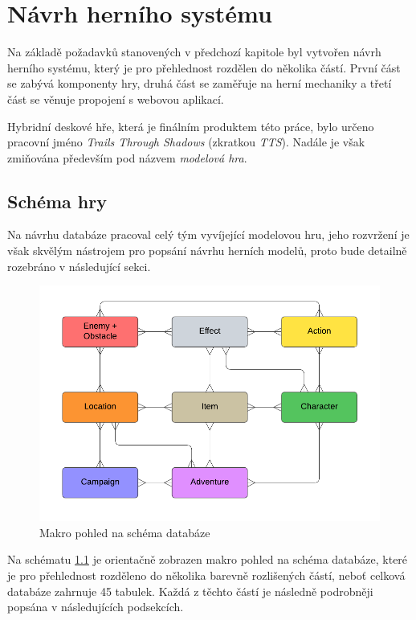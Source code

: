 \chapter{Návrh herního systému}
\label{chap:design}

Na základě požadavků stanovených v předchozí kapitole byl vytvořen návrh herního systému, který je pro přehlednost rozdělen do několika částí. První část se zabývá komponenty hry, druhá část se zaměřuje na herní mechaniky a třetí část se věnuje propojení s webovou aplikací.

Hybridní deskové hře, která je finálním produktem této práce, bylo určeno pracovní jméno \textit{Trails Through Shadows} (zkratkou \textit{TTS}). Nadále je však zmiňována především pod názvem \textit{modelová hra}.


\section{Schéma hry}
\label{sec:design_scheme}

Na návrhu databáze pracoval celý tým vyvíjející modelovou hru, jeho rozvržení je však skvělým nástrojem pro popsání návrhu herních modelů, proto bude detailně rozebráno v následující sekci.

\begin{figure}[h]
    \centering
    \includegraphics[scale=0.8]{../../shared/diagrams/er_macro.pdf}
    \caption{Makro pohled na schéma databáze}
    \label{diag:er_macro}
\end{figure}

Na schématu \ref{diag:er_macro} je orientačně zobrazen makro pohled na schéma databáze, které je pro přehlednost rozděleno do několika barevně rozlišených částí, neboť celková databáze zahrnuje 45 tabulek. Každá z těchto částí je následně podrobněji popsána v následujících podsekcích.


